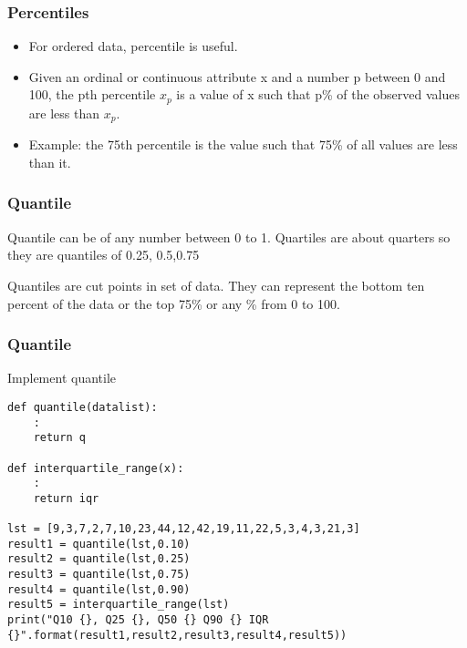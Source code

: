 





\begin{frame}[fragile]\frametitle{Percentiles}	
\begin{itemize}
\item For ordered data, percentile is useful.
\item Given an ordinal or continuous attribute x and a number p between 0 and 100, the pth percentile $x_p$ is a value of x such that p\% of the observed values are less than $x_p$.
\item Example: the 75th percentile is the value such that 75\% of all values are less than it.
\end{itemize}

\end{frame}


\begin{frame}[fragile]\frametitle{Quantile}	
Quantile can be of any number between 0 to 1. Quartiles are about quarters so they are quantiles of 0.25, 0.5,0.75

Quantiles are cut points in set of data. They can represent the bottom
ten percent of the data or the top 75\% or any \% from 0 to 100.
\end{frame}


\begin{frame}[fragile]\frametitle{Quantile}
Implement quantile
\begin{lstlisting}
def quantile(datalist):
	:
	return q

def interquartile_range(x):
	:
	return iqr
	
lst = [9,3,7,2,7,10,23,44,12,42,19,11,22,5,3,4,3,21,3]
result1 = quantile(lst,0.10)
result2 = quantile(lst,0.25)
result3 = quantile(lst,0.75)
result4 = quantile(lst,0.90)
result5 = interquartile_range(lst)
print("Q10 {}, Q25 {}, Q50 {} Q90 {} IQR {}".format(result1,result2,result3,result4,result5))
\end{lstlisting}
\end{frame}


